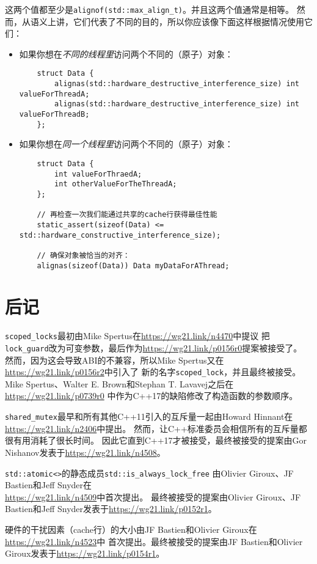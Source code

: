 这两个值都至少是\texttt{alignof(std::max\_align\_t)}。并且这两个值通常是相等。
然而，从语义上讲，它们代表了不同的目的，所以你应该像下面这样根据情况使用它们：
\begin{itemize}
    \item 如果你想在\emph{不同的线程里}访问两个不同的（原子）对象：
    \begin{lstlisting}
    struct Data {
        alignas(std::hardware_destructive_interference_size) int valueForThreadA;
        alignas(std::hardware_destructive_interference_size) int valueForThreadB;
    };
    \end{lstlisting}
    \item 如果你想在\emph{同一个线程里}访问两个不同的（原子）对象：
    \begin{lstlisting}
    struct Data {
        int valueForThraedA;
        int otherValueForTheThreadA;
    };

    // 再检查一次我们能通过共享的cache行获得最佳性能
    static_assert(sizeof(Data) <= std::hardware_constructive_interference_size);

    // 确保对象被恰当的对齐：
    alignas(sizeof(Data)) Data myDataForAThread;
    \end{lstlisting}
\end{itemize}

\section{后记}
\texttt{scoped\_locks}最初由Mike Spertus在\url{https://wg21.link/n4470}中提议
把\texttt{lock\_guard}改为可变参数，最后作为\url{https://wg21.link/p0156r0}提案被接受了。
然而，因为这会导致ABI的不兼容，所以Mike Spertus又在\url{https://wg21.link/p0156r2}中引入了
新的名字\texttt{scoped\_lock}，并且最终被接受。
Mike Spertus、Walter E. Brown和Stephan T. Lavavej之后在\url{https://wg21.link/p0739r0}
中作为C++17的缺陷修改了构造函数的参数顺序。

\texttt{shared\_mutex}最早和所有其他C++11引入的互斥量一起由Howard Hinnant在
\url{https://wg21.link/n2406}中提出。
然而，让C++标准委员会相信所有的互斥量都很有用消耗了很长时间。
因此它直到C++17才被接受，最终被接受的提案由Gor Nishanov发表于\url{https://wg21.link/n4508}。

\texttt{std::atomic<>}的静态成员\texttt{std::is\_always\_lock\_free}
由Olivier Giroux、JF Bastien和Jeff Snyder在\\
\url{https://wg21.link/n4509}中首次提出。
最终被接受的提案由Olivier Giroux、JF Bastien和Jeff Snyder发表于\url{https://wg21.link/p0152r1}。

硬件的干扰因素（cache行）的大小由JF Bastien和Olivier Giroux在\url{https://wg21.link/n4523}中
首次提出。最终被接受的提案由JF Bastien和Olivier Giroux发表于\url{https://wg21.link/p0154r1}。
